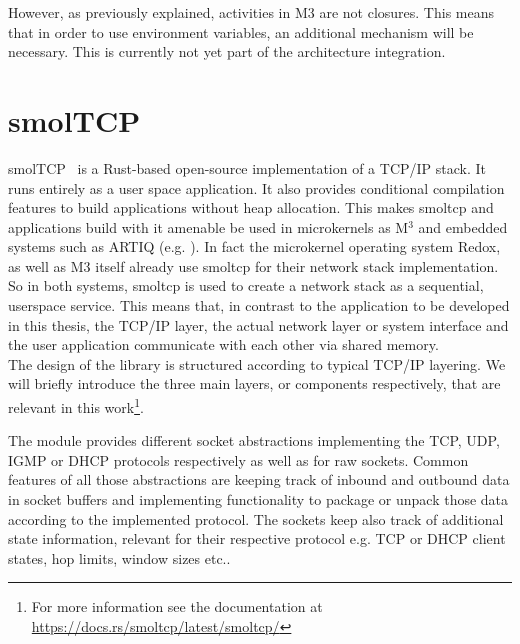 However, as previously explained, activities in M3 are not closures. This means that in order to use environment variables, an additional mechanism will be necessary. This is currently not yet part of the architecture integration.



\section{smolTCP}
smolTCP~\cite{smolTCP} is a Rust-based open-source implementation of a TCP/IP stack. It runs entirely as a user space application. It also provides conditional compilation features to build applications without heap allocation. This makes smoltcp and applications build with it amenable be used in microkernels as M$^3$\cite{Asmussen:M3v} and embedded systems such as ARTIQ (e.g. \cite{lam2021combining}). In fact the microkernel operating system Redox\cite{redoxwebsite}, as well as M3 itself already use smoltcp for their network stack implementation. So in both systems, smoltcp is used to create a network stack as a sequential, userspace service. This means that, in contrast to the application to be developed in this thesis, the TCP/IP layer, the actual network layer or system interface and the user application communicate with each other via shared memory. \\

The design of the library is structured according to typical TCP/IP layering. We will briefly introduce the three main layers, or components respectively, that are relevant in this work\footnote{For more information see the documentation at \url{https://docs.rs/smoltcp/latest/smoltcp/}}.


The  module provides different socket abstractions implementing the TCP, UDP, IGMP or DHCP protocols respectively as well as for raw sockets. Common features of all those abstractions are keeping track of inbound and outbound data in socket buffers and implementing functionality to package or unpack those data according to the implemented protocol. The sockets keep also track of additional state information, relevant for their respective protocol e.g. TCP or DHCP client states, hop limits, window sizes etc..\\

